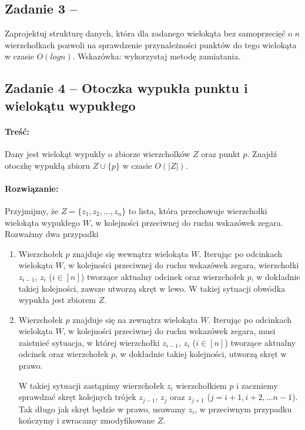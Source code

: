 \subsection{Zadanie 3 -- }
Zaprojektuj strukturę danych, która dla zadanego wielokąta bez samoprzecięć o 
$n$ wierzchołkach pozwoli
na sprawdzenie przynależności punktów do tego wielokąta w czasie $O(log n)$.
Wskazówka: wykorzystaj metodę zamiatania.

\subsection{Zadanie 4 -- Otoczka wypukła punktu i wielokątu wypukłego}
\paragraph{Treść:} Dany jest wielokąt wypukły o zbiorze wierzcholków $Z$ oraz punkt $p$. Znajdź otoczkę wypukłą zbioru $Z \cup \{p\}$ w czasie $O(|Z|)$.
\paragraph{Rozwiązanie:}
Przyjmijmy, że $Z = \{z_1, z_2, \ldots, z_n\}$ to lista, która przechowuje wierzchołki
wielokąta wypukłego $W$, w kolejności przeciwnej do ruchu wskazówek zegara.
Rozważmy dwa przypadki
\begin{enumerate}
	\item Wierzchołek $p$ znajduje się wewnątrz wielokąta $W$. Iterując po odcinkach
	wielokąta $W$, w kolejności przeciwnej do ruchu wskazówek zegara, wierzchołki
	$z_{i-1}$, $z_i$ ($i \in [n]$) tworzące aktualny odcinek oraz wierzchołek $p$, w dokładnie takiej kolejności, zawsze utworzą skręt w lewo. W takiej sytuacji obwódka wypukła jest zbiorem $Z$.
	
	\item Wierzchołek $p$ znajduje się na zewnątrz wielokąta $W$. Iterując po odcinkach
	wielokąta $W$, w kolejności przeciwnej do ruchu wskazówek zegara, musi zaistnieć sytuacja, w której wierzchołki
	$z_{i-1}$, $z_i$ ($i \in [n]$) tworzące aktualny odcinek oraz wierzchołek $p$, w dokładnie takiej kolejności, utworzą skręt w prawo.
	
	W takiej sytuacji zastąpimy wierzchołek $z_i$ wierzchołkiem $p$ i zaczniemy 
	sprawdzać skręt kolejnych trójek $z_{j-1}$, $z_j$ oraz $z_{j+1}$
	($j = i + 1, i + 2, \dots n - 1$). Tak długo
	jak skręt będzie w prawo, usuwamy $z_i$, w przeciwnym przypadku kończymy i zwracamy zmodyfikowane $Z$.
\end{enumerate}

